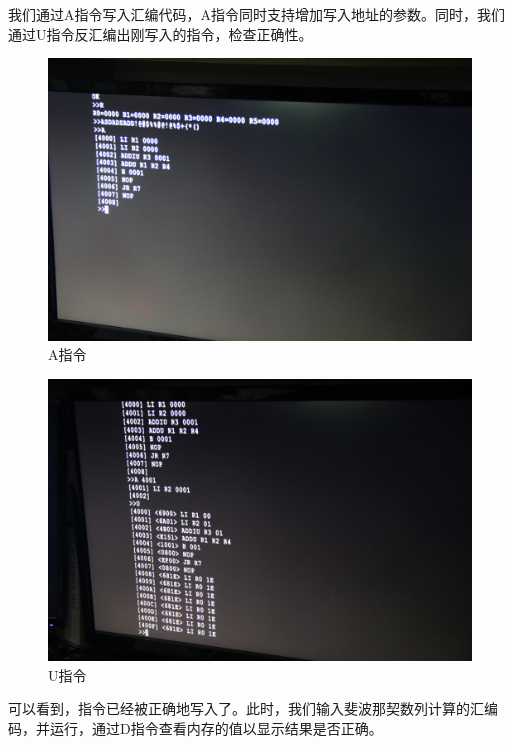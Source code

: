 我们通过A指令写入汇编代码，A指令同时支持增加写入地址的参数。同时，我们通过U指令反汇编出刚写入的指令，检查正确性。

\begin{figure}[H]
  \includegraphics[width=\linewidth]{Figures/picture/IMG_7235.JPG}
  \caption{A指令}
\end{figure}

\begin{figure}[H]
  \includegraphics[width=\linewidth]{Figures/picture/IMG_7236.JPG}
  \caption{U指令}
\end{figure}

可以看到，指令已经被正确地写入了。此时，我们输入斐波那契数列计算的汇编码，并运行，通过D指令查看内存的值以显示结果是否正确。

